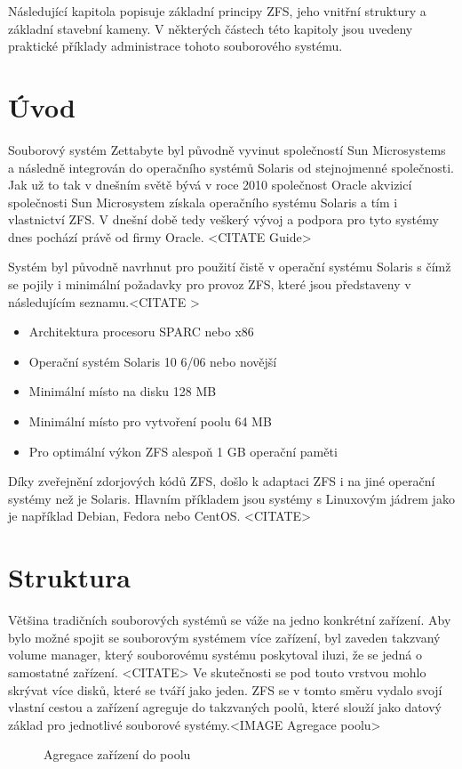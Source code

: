 Následující kapitola popisuje základní principy ZFS, jeho vnitřní struktury a základní stavební kameny. V některých částech této kapitoly jsou uvedeny praktické příklady administrace tohoto souborového systému.

\section{Úvod}
    Souborový systém Zettabyte byl původně vyvinut společností Sun Microsystems a následně integrován do operačního systémů Solaris od stejnojmenné společnosti.
    Jak už to tak v dnešním světě bývá v roce 2010 společnost Oracle akvizicí společnosti Sun Microsystem získala operačního systému Solaris a tím i vlastnictví ZFS. V dnešní době tedy veškerý vývoj a podpora pro tyto systémy dnes pochází právě od firmy Oracle. <CITATE Guide>

    Systém byl původně navrhnut pro použití čistě v operační systému Solaris s čímž se pojily i minimální požadavky pro provoz ZFS, které jsou představeny v následujícím seznamu.<CITATE >
    \begin{itemize}
      \item Architektura procesoru SPARC nebo x86
      \item Operační systém Solaris 10 6/06 nebo novější
      \item Minimální místo na disku 128 MB
      \item Minimální místo pro vytvoření poolu 64 MB
      \item Pro optimální výkon ZFS alespoň 1 GB operační paměti
    \end{itemize}
   
    Díky zveřejnění zdorjových kódů ZFS, došlo k adaptaci ZFS i na jiné operační systémy než je Solaris. Hlavním příkladem jsou systémy s Linuxovým jádrem jako je například Debian, Fedora nebo CentOS. <CITATE>

\section{Struktura}
Většina tradičních souborových systémů se váže na jedno konkrétní zařízení. Aby bylo možné spojit se souborovým systémem více zařízení, byl zaveden takzvaný volume manager, který souborovému systému poskytoval iluzi, že se jedná o samostatné zařízení. <CITATE> Ve skutečnosti se pod touto vrstvou mohlo skrývat více disků, které se tváří jako jeden. ZFS se v tomto směru vydalo svojí vlastní cestou a zařízení agreguje do takzvaných poolů, které slouží jako datový základ pro jednotlivé souborové systémy.<IMAGE Agregace poolu>
\begin{figure}[!h]
    \caption{Agregace zařízení do poolu}
    \label{agregation}
\end{figure}
